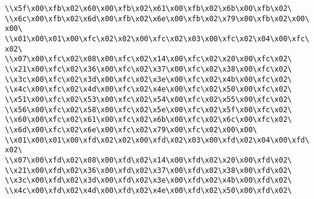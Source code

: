\verb|\\x5f\x00\xfb\x02\x60\x00\xfb\x02\x61\x00\xfb\x02\x6b\x00\xfb\x02\|\newline
\verb|\\x6c\x00\xfb\x02\x6d\x00\xfb\x02\x6e\x00\xfb\x02\x79\x00\xfb\x02\x00\x00\|\newline
\verb|\\x01\x00\x01\x00\xfc\x02\x02\x00\xfc\x02\x03\x00\xfc\x02\x04\x00\xfc\x02\|\newline
\verb|\\x07\x00\xfc\x02\x08\x00\xfc\x02\x14\x00\xfc\x02\x20\x00\xfc\x02\|\newline
\verb|\\x21\x00\xfc\x02\x36\x00\xfc\x02\x37\x00\xfc\x02\x38\x00\xfc\x02\|\newline
\verb|\\x3c\x00\xfc\x02\x3d\x00\xfc\x02\x3e\x00\xfc\x02\x4b\x00\xfc\x02\|\newline
\verb|\\x4c\x00\xfc\x02\x4d\x00\xfc\x02\x4e\x00\xfc\x02\x50\x00\xfc\x02\|\newline
\verb|\\x51\x00\xfc\x02\x53\x00\xfc\x02\x54\x00\xfc\x02\x55\x00\xfc\x02\|\newline
\verb|\\x56\x00\xfc\x02\x58\x00\xfc\x02\x5e\x00\xfc\x02\x5f\x00\xfc\x02\|\newline
\verb|\\x60\x00\xfc\x02\x61\x00\xfc\x02\x6b\x00\xfc\x02\x6c\x00\xfc\x02\|\newline
\verb|\\x6d\x00\xfc\x02\x6e\x00\xfc\x02\x79\x00\xfc\x02\x00\x00\|\newline
\verb|\\x01\x00\x01\x00\xfd\x02\x02\x00\xfd\x02\x03\x00\xfd\x02\x04\x00\xfd\x02\|\newline
\verb|\\x07\x00\xfd\x02\x08\x00\xfd\x02\x14\x00\xfd\x02\x20\x00\xfd\x02\|\newline
\verb|\\x21\x00\xfd\x02\x36\x00\xfd\x02\x37\x00\xfd\x02\x38\x00\xfd\x02\|\newline
\verb|\\x3c\x00\xfd\x02\x3d\x00\xfd\x02\x3e\x00\xfd\x02\x4b\x00\xfd\x02\|\newline
\verb|\\x4c\x00\xfd\x02\x4d\x00\xfd\x02\x4e\x00\xfd\x02\x50\x00\xfd\x02\|\newline

